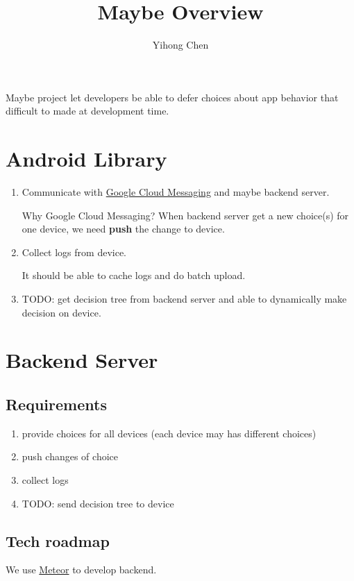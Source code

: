 \documentclass{article}
\title{Maybe Overview}
\author{Yihong Chen}
\date{}
\begin{document}
\maketitle

Maybe project let developers be able to defer choices about app behavior that difficult to made at development time.
\section{Android Library}
\label{sec:android-library}
\begin{enumerate}[label=\alph*.]
\item Communicate with \href{https://developer.android.com/google/gcm/index.html}{Google Cloud Messaging} and maybe backend server.

Why Google Cloud Messaging? When backend server get a new choice(s) for one device, we need \textbf{push} the change to device.
\item Collect logs from device.

It should be able to cache logs and do batch upload.
\item TODO: get decision tree from backend server and able to dynamically make decision on device.
\end{enumerate}

\section{Backend Server}
\label{sec:backend-server}

\subsection{Requirements}
\label{sec:requirements}

\begin{enumerate}[label=\alph*.]
\item provide choices for all devices (each device may has different choices)
\item push changes of choice
\item collect logs
\item TODO: send decision tree to device
\end{enumerate}

\subsection{Tech roadmap}
\label{sec:tech-roadmap}
We use \href{https://www.meteor.com/}{Meteor} to develop backend.
\end{document}
